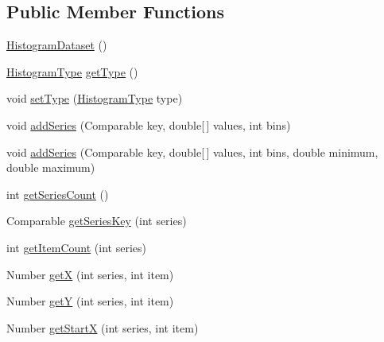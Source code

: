 \subsection*{Public Member Functions}
\begin{DoxyCompactItemize}
\item 
\mbox{\hyperlink{classorg_1_1jfree_1_1data_1_1statistics_1_1_histogram_dataset_ac851bee8cb3847f1fd821444d9c713b9}{Histogram\+Dataset}} ()
\item 
\mbox{\hyperlink{classorg_1_1jfree_1_1data_1_1statistics_1_1_histogram_type}{Histogram\+Type}} \mbox{\hyperlink{classorg_1_1jfree_1_1data_1_1statistics_1_1_histogram_dataset_aafe9272c17cc894ec306d665a49316b6}{get\+Type}} ()
\item 
void \mbox{\hyperlink{classorg_1_1jfree_1_1data_1_1statistics_1_1_histogram_dataset_a676e133775b16985fbe2478c9733e27f}{set\+Type}} (\mbox{\hyperlink{classorg_1_1jfree_1_1data_1_1statistics_1_1_histogram_type}{Histogram\+Type}} type)
\item 
void \mbox{\hyperlink{classorg_1_1jfree_1_1data_1_1statistics_1_1_histogram_dataset_aa366a1bb3131225602e6ac2ac6ec0710}{add\+Series}} (Comparable key, double\mbox{[}$\,$\mbox{]} values, int bins)
\item 
void \mbox{\hyperlink{classorg_1_1jfree_1_1data_1_1statistics_1_1_histogram_dataset_ad40eb1d4b4511e8724593e4ae2e13933}{add\+Series}} (Comparable key, double\mbox{[}$\,$\mbox{]} values, int bins, double minimum, double maximum)
\item 
int \mbox{\hyperlink{classorg_1_1jfree_1_1data_1_1statistics_1_1_histogram_dataset_a6dd14ceca0cb3f9b3d666a2aec480f8d}{get\+Series\+Count}} ()
\item 
Comparable \mbox{\hyperlink{classorg_1_1jfree_1_1data_1_1statistics_1_1_histogram_dataset_a8d2fb8164ead00eaa7a1d09cc70eb803}{get\+Series\+Key}} (int series)
\item 
int \mbox{\hyperlink{classorg_1_1jfree_1_1data_1_1statistics_1_1_histogram_dataset_a09cac32858b5274bcfe7b8070a52d5e5}{get\+Item\+Count}} (int series)
\item 
Number \mbox{\hyperlink{classorg_1_1jfree_1_1data_1_1statistics_1_1_histogram_dataset_a0d0b61165a8016d43005d1d4a41b0c79}{getX}} (int series, int item)
\item 
Number \mbox{\hyperlink{classorg_1_1jfree_1_1data_1_1statistics_1_1_histogram_dataset_a306f5b5bbf13aeca319bc90cbb855010}{getY}} (int series, int item)
\item 
Number \mbox{\hyperlink{classorg_1_1jfree_1_1data_1_1statistics_1_1_histogram_dataset_aeac47110575d30da4a60153d8842a6da}{get\+StartX}} (int series, int item)

\end{DoxyCompactItemize}
